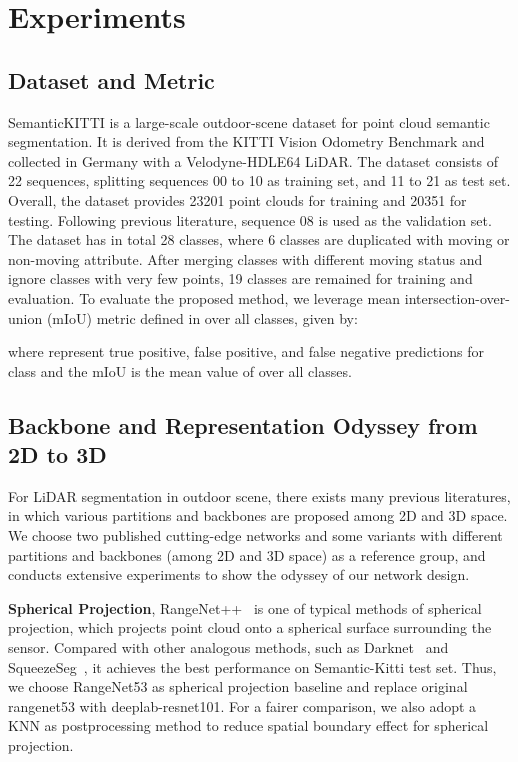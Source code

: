 \documentclass{article}
\begin{document}
 
\section{Experiments}



\subsection{Dataset and Metric}

SemanticKITTI \citep{behley2019semantickitti} is a large-scale outdoor-scene dataset for point cloud semantic segmentation. It is derived from the KITTI Vision Odometry Benchmark and collected in Germany with a Velodyne-HDLE64 LiDAR. The dataset consists of 22 sequences, splitting sequences 00 to 10 as training set, and 11 to 21 as test set. Overall, the dataset provides 23201 point clouds for training and 20351 for testing. Following previous literature, sequence 08 is used as the validation set. The dataset has in total 28 classes, where 6 classes are duplicated with moving or non-moving attribute. After merging classes with different moving status and ignore classes with very few points, 19 classes are remained for training and evaluation. To evaluate the proposed method, we leverage mean intersection-over-union (mIoU) metric defined in \citep{behley2019semantickitti} over all classes, given by:

where  represent true positive, false positive, and false negative predictions for
class  and the mIoU is the mean value of  over all classes.


\subsection{Backbone and Representation Odyssey from 2D to 3D}
\label{sec:exp_baseline}

For LiDAR segmentation in outdoor scene, there exists many previous literatures, in which various partitions and backbones are proposed among 2D and 3D space. We choose two published cutting-edge networks and some variants with different partitions and backbones (among 2D and 3D space) as a reference group, and conducts extensive experiments to show the odyssey of our network design.

\textbf{Spherical Projection}, RangeNet++~\citep{milioto2019rangenet++} is one of typical methods of spherical projection, which projects point cloud onto a spherical surface surrounding the sensor. Compared with other analogous methods, such as Darknet~\citep{behley2019semantickitti} and SqueezeSeg~\citep{wu2018squeezeseg}, it achieves the best performance on Semantic-Kitti test set. Thus, we choose RangeNet53 as spherical projection baseline and replace original rangenet53 with deeplab-resnet101. For a fairer comparison, we also adopt a KNN as postprocessing method to reduce spatial boundary effect for spherical projection.
\end{document}
